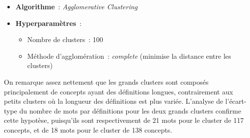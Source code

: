 \begin{itemize}
    \item \textbf{Algorithme}~: \textit{Agglomerative Clustering}
    \item \textbf{Hyperparamètres}~: 
    \begin{itemize}
        \item Nombre de clusters~: 100
        \item Méthode d'agglomération~: \textit{complete} (minimise la distance entre les clusters)
        \newline
    \end{itemize}
\end{itemize}

On remarque assez nettement que les grands clusters sont composés principalement de concepts ayant des définitions longues, contrairement aux petits clusters où la longueur des définitions est plus variée. L'analyse de l'écart-type du nombre de mots par définitions pour les deux grands clusters confirme cette hypotèse, puisqu'ils sont respectivement de 21 mots pour le cluster de 117 concepts, et de 18 mots pour le cluster de 138 concepts.

\label{hierarchisation}
\newpage

